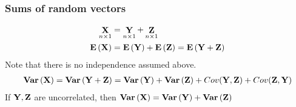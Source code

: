 \subsubsection*{Sums of random vectors}
$$
\begin{aligned}
\mathop \mathbf{X}\limits_{n \times 1} &= \mathop \mathbf{Y}\limits_{n \times 1} +\mathop \mathbf{Z}\limits_{n \times 1}\\
{\mathbf{E}\left(\mathbf{X}\right)} &= {\mathbf{E}\left(\mathbf{Y}\right)} +  {\mathbf{E}\left(\mathbf{Z}\right)} = {\mathbf{E}\left(\mathbf{Y} + \mathbf{Z}\right)}\\
\end{aligned}
$$
Note that there is no independence assumed above.
$$
\begin{aligned}
\mathbf{Var}\left(\mathbf{X}\right) = \mathbf{Var}\left(\mathbf{Y} + \mathbf{Z}\right) = \mathbf{Var}\left(\mathbf{Y}\right) +\mathbf{Var}\left(\mathbf{Z}\right) + Cov(\mathbf{Y}, \mathbf{Z}) + Cov(\mathbf{Z}, \mathbf{Y})
\end{aligned}
$$
If $\mathbf{Y}, \mathbf{Z}$ are uncorrelated, then $\mathbf{Var}\left(\mathbf{X}\right) = \mathbf{Var}\left(\mathbf{Y}\right)+ \mathbf{Var}\left(\mathbf{Z}\right)$ 





